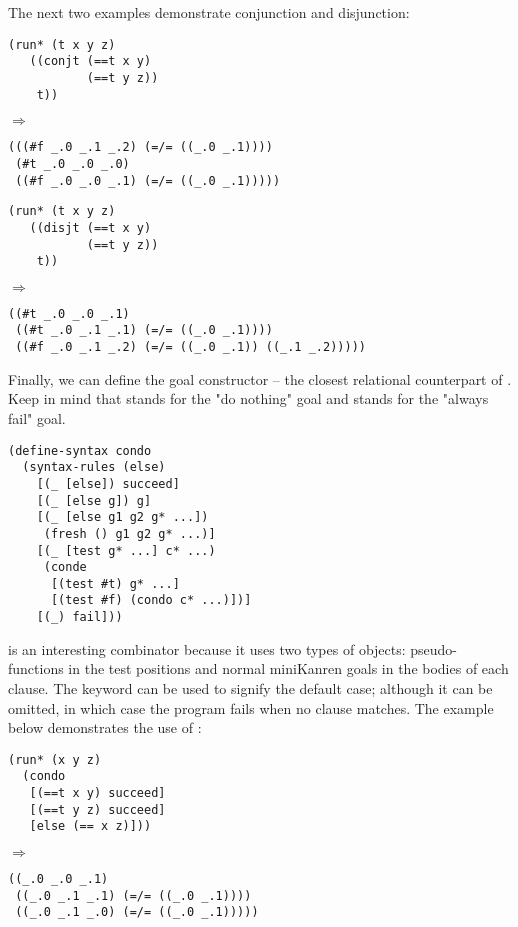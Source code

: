 The next two examples demonstrate conjunction and disjunction:
\begin{lstlisting}
(run* (t x y z)
   ((conjt (==t x y)
           (==t y z))
    t))
\end{lstlisting}
$\Rightarrow$
\begin{lstlisting}
(((#f _.0 _.1 _.2) (=/= ((_.0 _.1))))
 (#t _.0 _.0 _.0)
 ((#f _.0 _.0 _.1) (=/= ((_.0 _.1)))))
\end{lstlisting}

\begin{lstlisting}
(run* (t x y z)
   ((disjt (==t x y)
           (==t y z))
    t))
\end{lstlisting}
$\Rightarrow$
\begin{lstlisting}
((#t _.0 _.0 _.1)
 ((#t _.0 _.1 _.1) (=/= ((_.0 _.1))))
 ((#f _.0 _.1 _.2) (=/= ((_.0 _.1)) ((_.1 _.2)))))
\end{lstlisting}

Finally, we can define the goal constructor  -- the closest relational counterpart of . Keep in mind that  stands for the "do nothing" goal and  stands for the "always fail" goal.
\begin{lstlisting}
(define-syntax condo
  (syntax-rules (else)
    [(_ [else]) succeed]
    [(_ [else g]) g]
    [(_ [else g1 g2 g* ...])
     (fresh () g1 g2 g* ...)]
    [(_ [test g* ...] c* ...)
     (conde
      [(test #t) g* ...]
      [(test #f) (condo c* ...)])]
    [(_) fail]))
\end{lstlisting}
 is an interesting combinator because it uses two types of objects: pseudo-functions in the test positions and normal miniKanren goals in the bodies of each clause. The  keyword can be used to signify the default case; although it can be omitted, in which case the program fails when no clause matches. The example below demonstrates the use of :
\begin{lstlisting}
(run* (x y z)
  (condo
   [(==t x y) succeed]
   [(==t y z) succeed]
   [else (== x z)]))
\end{lstlisting}
$\Rightarrow$
\begin{lstlisting}
((_.0 _.0 _.1)
 ((_.0 _.1 _.1) (=/= ((_.0 _.1))))
 ((_.0 _.1 _.0) (=/= ((_.0 _.1)))))
\end{lstlisting}

